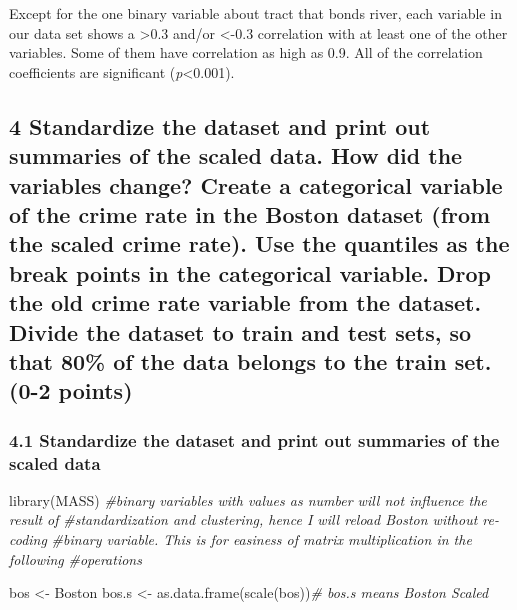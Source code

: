 \documentclass[
]{article}
\newenvironment{Shaded}{\begin{snugshade}}{\end{snugshade}}
\newcommand{\CommentTok}[1]{\textcolor[rgb]{0.56,0.35,0.01}{\textit{#1}}}
\newcommand{\FunctionTok}[1]{\textcolor[rgb]{0.00,0.00,0.00}{#1}}
\newcommand{\NormalTok}[1]{#1}
\newcommand{\OtherTok}[1]{\textcolor[rgb]{0.56,0.35,0.01}{#1}}
\begin{document}
Except for the one binary variable about tract that bonds river, each
variable in our data set shows a \textgreater0.3 and/or \textless-0.3
correlation with at least one of the other variables. Some of them have
correlation as high as 0.9. All of the correlation coefficients are
significant (\emph{p}\textless0.001).

\hypertarget{standardize-the-dataset-and-print-out-summaries-of-the-scaled-data.-how-did-the-variables-change-create-a-categorical-variable-of-the-crime-rate-in-the-boston-dataset-from-the-scaled-crime-rate.-use-the-quantiles-as-the-break-points-in-the-categorical-variable.-drop-the-old-crime-rate-variable-from-the-dataset.-divide-the-dataset-to-train-and-test-sets-so-that-80-of-the-data-belongs-to-the-train-set.-0-2-points}{%
\subsection{4 Standardize the dataset and print out summaries of the
scaled data. How did the variables change? Create a categorical variable
of the crime rate in the Boston dataset (from the scaled crime rate).
Use the quantiles as the break points in the categorical variable. Drop
the old crime rate variable from the dataset. Divide the dataset to
train and test sets, so that 80\% of the data belongs to the train set.
(0-2
points)}\label{standardize-the-dataset-and-print-out-summaries-of-the-scaled-data.-how-did-the-variables-change-create-a-categorical-variable-of-the-crime-rate-in-the-boston-dataset-from-the-scaled-crime-rate.-use-the-quantiles-as-the-break-points-in-the-categorical-variable.-drop-the-old-crime-rate-variable-from-the-dataset.-divide-the-dataset-to-train-and-test-sets-so-that-80-of-the-data-belongs-to-the-train-set.-0-2-points}}

\hypertarget{standardize-the-dataset-and-print-out-summaries-of-the-scaled-data}{%
\subsubsection{4.1 Standardize the dataset and print out summaries of
the scaled
data}\label{standardize-the-dataset-and-print-out-summaries-of-the-scaled-data}}

\begin{Shaded}
\begin{Highlighting}[]
\FunctionTok{library}\NormalTok{(MASS)}
\CommentTok{\#binary variables with values as number will not influence the result of }
\CommentTok{\#standardization and clustering, hence I will reload Boston without re{-}coding}
\CommentTok{\#binary variable. This is for easiness of matrix multiplication in the following}
\CommentTok{\#operations}
              
\NormalTok{bos }\OtherTok{\textless{}{-}}\NormalTok{ Boston }
\NormalTok{bos.s }\OtherTok{\textless{}{-}} \FunctionTok{as.data.frame}\NormalTok{(}\FunctionTok{scale}\NormalTok{(bos))}\CommentTok{\# bos.s means Boston Scaled}
\end{Highlighting}
\end{Shaded}
\end{document}
